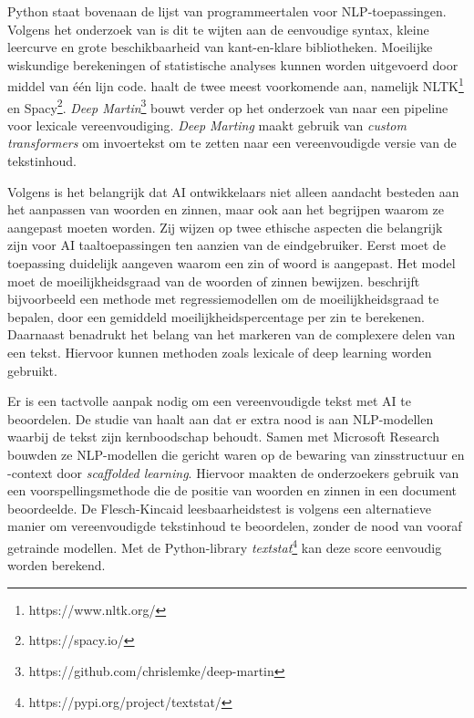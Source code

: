 Python staat bovenaan de lijst van programmeertalen voor NLP-toepassingen. Volgens het onderzoek van \textcite{Thangarajah2019} is dit te wijten aan de eenvoudige syntax, kleine leercurve en grote beschikbaarheid van kant-en-klare bibliotheken. Moeilijke wiskundige berekeningen of statistische analyses kunnen worden uitgevoerd door middel van één lijn code. \textcite{Malik2022} haalt de twee meest voorkomende aan, namelijk NLTK\footnote{https://www.nltk.org/} en Spacy\footnote{https://spacy.io/}. \textit{Deep Martin}\footnote{https://github.com/chrislemke/deep-martin} bouwt verder op het onderzoek van \textcite{Shardlow2014} naar een pipeline voor lexicale vereenvoudiging. \textit{Deep Marting} maakt gebruik van \textit{custom transformers} om invoertekst om te zetten naar een vereenvoudigde versie van de tekstinhoud.

Volgens \textcite{Garbacea2021} is het belangrijk dat AI ontwikkelaars niet alleen aandacht besteden aan het aanpassen van woorden en zinnen, maar ook aan het begrijpen waarom ze aangepast moeten worden. Zij wijzen op twee ethische aspecten die belangrijk zijn voor AI taaltoepassingen ten aanzien van de eindgebruiker. Eerst moet de toepassing duidelijk aangeven waarom een zin of woord is aangepast. Het model moet de moeilijkheidsgraad van de woorden of zinnen bewijzen. \textcite{Iavarone2021} beschrijft bijvoorbeeld een methode met regressiemodellen om de moeilijkheidsgraad te bepalen, door een gemiddeld moeilijkheidspercentage per zin te berekenen. Daarnaast benadrukt \textcite{Garbacea2021} het belang van het markeren van de complexere delen van een tekst. Hiervoor kunnen methoden zoals lexicale of deep learning worden gebruikt.

Er is een tactvolle aanpak nodig om een vereenvoudigde tekst met AI te beoordelen. De studie van \textcite{Swayamdipta2019} haalt aan dat er extra nood is aan NLP-modellen waarbij de tekst zijn kernboodschap behoudt. Samen met Microsoft Research bouwden ze NLP-modellen die gericht waren op de bewaring van zinsstructuur en -context door \emph{scaffolded learning}. Hiervoor maakten de onderzoekers gebruik van een voorspellingsmethode die de positie van woorden en zinnen in een document beoordeelde. De Flesch-Kincaid leesbaarheidstest is volgens \textcite{Readable2021} een alternatieve manier om vereenvoudigde tekstinhoud te beoordelen, zonder de nood van vooraf getrainde modellen. Met de Python-library \textit{textstat}\footnote{https://pypi.org/project/textstat/} kan deze score eenvoudig worden berekend. 

